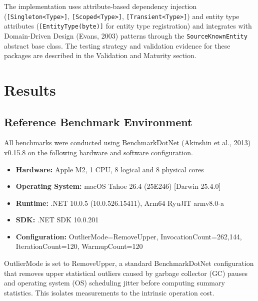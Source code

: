 \documentclass[fleqn,10pt,lineno]{wlpeerj}
\providecommand{\tightlist}{%
  \setlength{\itemsep}{0pt}\setlength{\parskip}{0pt}}
\begin{document}
The implementation uses attribute-based dependency injection
(\texttt{{[}Singleton\textless{}Type\textgreater{}{]}},
\texttt{{[}Scoped\textless{}Type\textgreater{}{]}},
\texttt{{[}Transient\textless{}Type\textgreater{}{]}}) and entity type
attributes (\texttt{{[}EntityType(byte){]}} for entity type
registration) and integrates with Domain-Driven Design (Evans, 2003)
patterns through the \texttt{SourceKnownEntity} abstract base class. The
testing strategy and validation evidence for these packages are
described in the Validation and Maturity section.

\section{Results}\label{results}

\subsection{Reference Benchmark
Environment}\label{reference-benchmark-environment}

All benchmarks were conducted using BenchmarkDotNet ({Akinshin et al.},
2013) v0.15.8 on the following hardware and software configuration.

\begin{itemize}
\tightlist
\item
  \textbf{Hardware:} Apple M2, 1 CPU, 8 logical and 8 physical cores
\item
  \textbf{Operating System:} macOS Tahoe 26.4 (25E246) {[}Darwin
  25.4.0{]}
\item
  \textbf{Runtime:} .NET 10.0.5 (10.0.526.15411), Arm64 RyuJIT armv8.0-a
\item
  \textbf{SDK:} .NET SDK 10.0.201
\item
  \textbf{Configuration:} OutlierMode=RemoveUpper,
  InvocationCount=262,144, IterationCount=120, WarmupCount=120
\end{itemize}

OutlierMode is set to RemoveUpper, a standard BenchmarkDotNet
configuration that removes upper statistical outliers caused by garbage
collector (GC) pauses and operating system (OS) scheduling jitter before
computing summary statistics. This isolates measurements to the
intrinsic operation cost.
\end{document}
